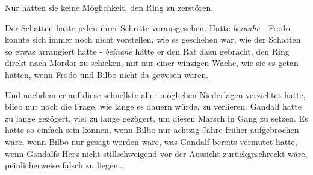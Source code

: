 Nur hatten sie keine Möglichkeit, den Ring zu zerstören.

Der Schatten hatte jeden ihrer Schritte vorausgesehen. Hatte \emph{beinahe} - Frodo konnte sich immer noch nicht vorstellen, wie es geschehen war, wie der Schatten so etwas arrangiert hatte - \emph{beinahe} hätte er den Rat dazu gebracht, den Ring direkt nach Mordor zu schicken, mit nur einer winzigen Wache, wie sie es getan hätten, wenn Frodo und Bilbo nicht da gewesen wären.

Und nachdem er auf diese schnellste aller möglichen Niederlagen verzichtet hatte, blieb nur noch die Frage, wie lange es dauern würde, zu verlieren. Gandalf hatte zu lange gezögert, viel zu lange gezögert, um diesen Marsch in Gang zu setzen. Es hätte so einfach sein können, wenn Bilbo nur achtzig Jahre früher aufgebrochen wäre, wenn Bilbo nur gesagt worden wäre, was Gandalf bereits vermutet hatte, wenn Gandalfs Herz nicht stillschweigend vor der Aussicht zurückgeschreckt wäre, peinlicherweise falsch zu liegen…

